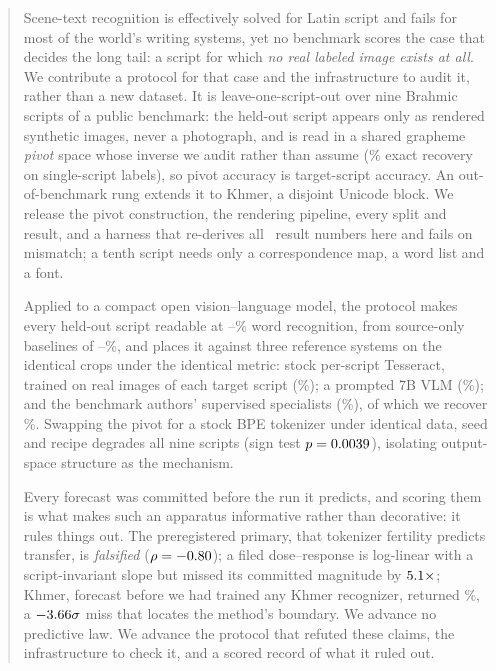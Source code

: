\begin{abstract}
Scene-text recognition is effectively solved for Latin script and fails for most of the world's writing
systems, yet no benchmark scores the case that decides the long tail: a script for which \emph{no
real labeled image exists at all}. We contribute a protocol for that case and the infrastructure to
audit it, rather than a new dataset. It is leave-one-script-out over nine Brahmic scripts of a public
benchmark: the held-out script appears only as rendered synthetic images, never a photograph, and
is read in a shared grapheme \emph{pivot} space whose inverse we audit rather than assume
(\rtWordPure\% exact recovery on single-script labels), so pivot accuracy is target-script accuracy. An out-of-benchmark rung extends it to Khmer, a disjoint Unicode block. We
release the pivot construction, the rendering pipeline, every split and result, and a harness that
re-derives all \verifyMacros\ result numbers here and fails on mismatch; a tenth script needs only
a correspondence map, a word list and a font.

Applied to a compact open vision--language model, the protocol makes every held-out script readable
at \wrrBmin--\wrrBmax\% word recognition, from source-only baselines of
\wrrAtamil--\wrrAdevanagari\%, and places it against three reference systems on the identical
crops under the identical metric: stock per-script Tesseract, trained on real images of each
target script (\tessMean\%); a prompted 7B VLM (\vlmMacro\%); and the benchmark authors'
supervised specialists (\parseqMean\%), of which we recover \oursOverCeilingPct\%. Swapping the pivot for a stock BPE tokenizer
under identical data, seed and recipe degrades all nine scripts (sign test $p=\bpeSignP$),
isolating output-space structure as the mechanism.

Every forecast was committed before the run it predicts, and scoring them is what makes such an
apparatus informative rather than decorative: it rules things out. The preregistered primary,
that tokenizer fertility predicts transfer, is \emph{falsified} ($\rho=\spearFert$); a filed
dose--response is log-linear with a script-invariant slope but missed its committed magnitude by
$\scaleSlopeRatio\times$; Khmer, forecast before we had trained any Khmer recognizer, returned \khmerB\%,
a $\khmerResidRMSE\sigma$ miss that locates the method's boundary. We advance no predictive law. We
advance the protocol that refuted these claims, the infrastructure to check it, and a scored record
of what it ruled out.
\end{abstract}
